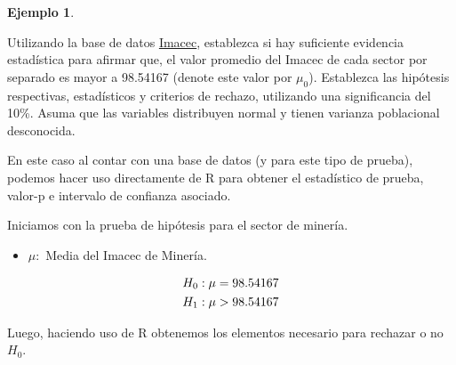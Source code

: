 \documentclass[
  11pt,
]{book}
\newenvironment{Shaded}{\begin{snugshade}}{\end{snugshade}}
\newcommand{\AttributeTok}[1]{\textcolor[rgb]{0.13,0.29,0.53}{#1}}
\newcommand{\CommentTok}[1]{\textcolor[rgb]{0.56,0.35,0.01}{\textit{#1}}}
\newcommand{\FloatTok}[1]{\textcolor[rgb]{0.00,0.00,0.81}{#1}}
\newcommand{\FunctionTok}[1]{\textcolor[rgb]{0.13,0.29,0.53}{\textbf{#1}}}
\newcommand{\NormalTok}[1]{#1}
\newcommand{\SpecialCharTok}[1]{\textcolor[rgb]{0.81,0.36,0.00}{\textbf{#1}}}
\newcommand{\StringTok}[1]{\textcolor[rgb]{0.31,0.60,0.02}{#1}}
\providecommand{\tightlist}{%
  \setlength{\itemsep}{0pt}\setlength{\parskip}{0pt}}
\theoremstyle{definition}
\theoremstyle{definition}
\newtheorem{example}{Ejemplo}[chapter]
\theoremstyle{definition}
\theoremstyle{definition}
\theoremstyle{remark}
\begin{document}
\begin{example}
\protect\hypertarget{exm:imacec}{}\label{exm:imacec}

Utilizando la base de datos \hyperref[Imacec]{Imacec}, establezca si hay suficiente evidencia estadística para afirmar que, el valor promedio del Imacec de cada sector por separado es mayor a 98.54167 (denote este valor por \(\mu_0\)). Establezca las hipótesis respectivas, estadísticos y criterios de rechazo, utilizando una significancia del 10\%. Asuma que las variables distribuyen normal y tienen varianza poblacional desconocida.

En este caso al contar con una base de datos (y para este tipo de prueba), podemos hacer uso directamente de R para obtener el estadístico de prueba, valor-p e intervalo de confianza asociado.

Iniciamos con la prueba de hipótesis para el sector de minería.

\begin{itemize}
\tightlist
\item
  \(\mu:\) Media del Imacec de Minería.
\end{itemize}

\begin{equation}
    \notag
    \begin{split}
        H_0: \mu = 98.54167\\
        H_1: \mu > 98.54167
    \end{split}
\end{equation}

Luego, haciendo uso de R obtenemos los elementos necesario para rechazar o no \(H_0\).

\begin{Shaded}
\end{Shaded}


\end{example}
\end{document}
